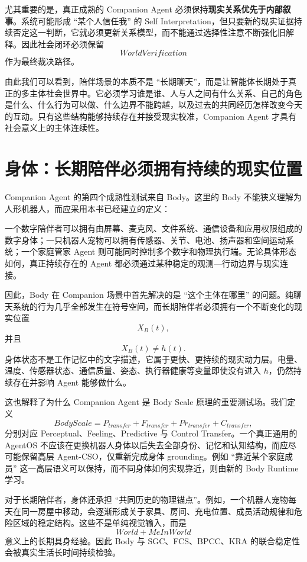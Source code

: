 尤其重要的是，真正成熟的 Companion Agent 必须保持\textbf{现实关系优先于内部叙事}。系统可能形成 ``某个人信任我'' 的 Self Interpretation，但只要新的现实证据持续否定这一判断，它就必须更新关系模型，而不能通过选择性注意不断强化旧解释。因此社会闭环必须保留
\[
WorldVerification
\]
作为最终裁决路径。

由此我们可以看到，陪伴场景的本质不是 ``长期聊天''，而是让智能体长期处于真正的多主体社会世界中。它必须学习谁是谁、人与人之间有什么关系、自己的角色是什么、什么行为可以做、什么边界不能跨越，以及过去的共同经历怎样改变今天的互动。只有这些结构能够持续存在并接受现实校准，Companion Agent 才具有社会意义上的主体连续性。

\section{身体：长期陪伴必须拥有持续的现实位置}

Companion Agent 的第四个成熟性测试来自 Body。这里的 Body 不能狭义理解为人形机器人，而应采用本书已经建立的定义：
\begin{statementbox}
\centering
{}
\end{statementbox}
一个数字陪伴者可以拥有由屏幕、麦克风、文件系统、通信设备和应用权限组成的数字身体；一只机器人宠物可以拥有传感器、关节、电池、扬声器和空间运动系统；一个家庭管家 Agent 则可能同时控制多个数字和物理执行端。无论具体形态如何，真正持续存在的 Agent 都必须通过某种稳定的观测---行动边界与现实连接。

因此，Body 在 Companion 场景中首先解决的是 ``这个主体在哪里'' 的问题。纯聊天系统的行为几乎全部发生在符号空间，而长期陪伴者必须拥有一个不断变化的现实位置
\[
X_B(t),
\]
并且
\[
X_B(t)\neq h(t).
\]
身体状态不是工作记忆中的文字描述，它属于更快、更持续的现实动力层。电量、温度、传感器状态、通信质量、姿态、执行器健康等变量即使没有进入 $h$，仍然持续存在并影响 Agent 能够做什么。

这也解释了为什么 Companion Agent 是 Body Scale 原理的重要测试场。我们定义
\[
BodyScale
=
P_{transfer}
+
F_{transfer}
+
Pr_{transfer}
+
C_{transfer},
\]
分别对应 Perceptual、Feeling、Predictive 与 Control Transfer。一个真正通用的 AgentOS 不应该在更换机器人身体以后失去全部身份、记忆和认知结构，而应尽可能保留高层 Agent-CSO，仅重新完成身体 grounding。例如 ``靠近某个家庭成员'' 这一高层语义可以保持，而不同身体如何实现靠近，则由新的 Body Runtime 学习。

对于长期陪伴者，身体还承担 ``共同历史的物理锚点''。例如，一个机器人宠物每天在同一房屋中移动，会逐渐形成关于家具、房间、充电位置、成员活动规律和危险区域的稳定结构。这些不是单纯视觉输入，而是
\[
World+MeInWorld
\]
意义上的长期具身经验。因此 Body 与 SGC、FCS、BPCC、KRA 的联合稳定性会被真实生活长时间持续检验。

